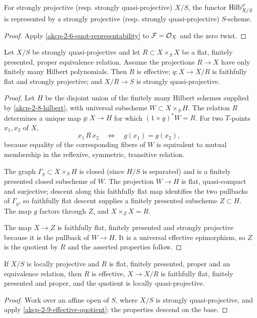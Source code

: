 \begin{corollary}
\label{akcp-2-8-hilbert}
For strongly projective (resp. strongly quasi-projective) $X/S$, the functor
$\operatorname{Hilb}^\varphi_{X/S}$ is represented by a strongly projective (resp. strongly
quasi-projective) $S$-scheme.
\end{corollary}
\begin{proof}
Apply \cref{akcp-2-6-quot-representability} to $\mathcal F=\mathcal O_X$ and the zero twist.
\end{proof}

\begin{theorem}
\label{akcp-2-9-effective-quotient}
Let $X/S$ be strongly quasi-projective and let $R\subset X\times_S X$ be a
flat, finitely presented, proper equivalence relation.  Assume the projections
$R\to X$ have only finitely many Hilbert polynomials.  Then $R$ is effective;
$q:X\to X/R$ is faithfully flat and strongly projective; and $X/R\to S$ is
strongly quasi-projective.
\end{theorem}
\begin{proof}
Let $H$ be the disjoint union of the finitely many Hilbert schemes supplied by
\cref{akcp-2-8-hilbert}, with universal subscheme $W\subset X\times_S H$.
The relation $R$ determines a unique map $g:X\to H$ for which
$(1\times g)^*W=R$.  For two $T$-points $x_1,x_2$ of $X$,
\[
x_1\,R\,x_2\quad\Longleftrightarrow\quad g(x_1)=g(x_2),
\]
because equality of the corresponding fibers of $W$ is equivalent to mutual
membership in the reflexive, symmetric, transitive relation.

The graph $\Gamma_g\subset X\times_S H$ is closed (since $H/S$ is separated)
and is a finitely presented closed subscheme of $W$.  The projection $W\to H$ is flat, quasi-compact and
surjective; descent along this faithfully flat map identifies the two pullbacks
of $\Gamma_g$, so faithfully flat descent supplies a finitely presented
subscheme $Z\subset H$.  The map $g$ factors through $Z$, and
$X\times_ZX=R$.

The map $X\to Z$ is faithfully flat, finitely presented and strongly projective
because it is the pullback of $W\to H$.  It is a universal effective epimorphism,
so $Z$ is the quotient by $R$ and the asserted properties follow.
\end{proof}

\begin{corollary}
\label{akcp-2-10-local-quotient}
If $X/S$ is locally projective and $R$ is flat, finitely presented, proper and
an equivalence relation, then $R$ is effective, $X\to X/R$ is faithfully flat,
finitely presented and proper, and the quotient is locally quasi-projective.
\end{corollary}
\begin{proof}
Work over an affine open of $S$, where $X/S$ is strongly quasi-projective, and
apply \cref{akcp-2-9-effective-quotient}; the properties descend on the base.
\end{proof}
